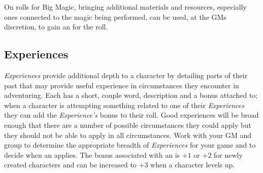 On rolls for Big Magic, bringing additional materials and resources, especially ones connected to the magic being performed, can be used, at the GMs discretion, to gain an \Advantage{} for the roll.

\subsection{Experiences}
\emph{Experiences} provide additional depth to a character by detailing parts of their past that may provide useful experience in circumstances they encounter in adventuring.
Each \Experience{} has a short, couple word, description and a bonus attached to; when a character is attempting something related to one of their \emph{Experiences} they can add the \emph{Experience's} bonus to their roll.
Good experiences will be broad enough that there are a number of possible circumstances they could apply but they should not be able to apply in all circumstances.
Work with your GM and group to determine the appropriate breadth of \emph{Experiences} for your game and to decide when an \Experience{} applies.
The bonus associated with an \Experience{} is $+1$ or $+2$ for newly created characters and can be increased to $+3$ when a character levels up.

